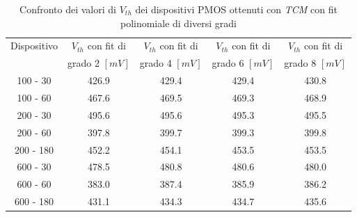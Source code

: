 \documentclass[12pt, letterpaper]{book}
\begin{document}
\begin{table}[htp] 
\renewcommand{\arraystretch}{1.3}
\caption{Confronto dei valori di $V_{th}$ dei dispositivi PMOS ottenuti con \emph{TCM} con fit polinomiale di diversi gradi}
\label{tab:GradiTCM} 
\begin{center}
\begin{tabular}{c c c c c}
\hline
Dispositivo &  $V_{th}$  con fit di & $V_{th}$  con fit di & $V_{th}$  con fit di & $V_{th}$  con fit di \\
 & grado 2 $[mV]$ & grado 4 $[mV]$ & grado 6 $[mV]$ & grado 8 $[mV]$ \\
\hline
100 - 30  & 426.9 &  429.4 &  429.4 & 430.8\\
\hline
100 - 60  & 467.6 & 469.5 & 469.3 & 468.9\\
\hline
200 - 30  & 495.6 & 495.6 & 495.3 & 495.5\\
\hline
200 - 60  & 397.8 & 399.7 & 399.3 & 399.8 \\
\hline
200 - 180 & 452.2 & 454.1 & 453.5 & 453.5 \\
\hline
600 - 30 & 478.5  & 480.8 & 480.6 & 480.0 \\
\hline
600 - 60 & 383.0 & 387.4 & 385.9 & 386.2 \\
\hline
600 - 180 & 431.1 & 434.3 & 434.7 & 435.6 \\
\hline
\end{tabular}
\end{center}
\end{table} 
\end{document}
